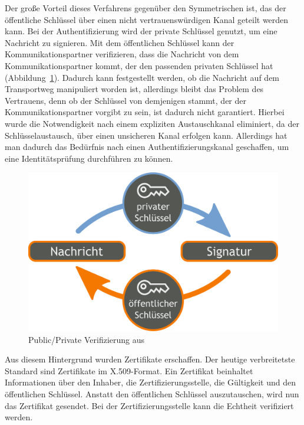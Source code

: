 \documentclass[11pt,a4paper]{report}
\begin{document}
Der große Vorteil dieses Verfahrens gegenüber den Symmetrischen ist, das der öffentliche Schlüssel über einen nicht vertrauenswürdigen Kanal geteilt werden kann. Bei der Authentifizierung wird der private Schlüssel genutzt, um eine Nachricht zu signieren. Mit dem öffentlichen Schlüssel kann der Kommunikationspartner verifizieren, dass die Nachricht von dem Kommunikationspartner kommt, der den passenden privaten Schlüssel hat (Abbildung~\ref{fig:pp_veri}). Dadurch kann festgestellt werden, ob die Nachricht auf dem Transportweg manipuliert worden ist, allerdings bleibt das Problem des Vertrauens, denn ob der Schlüssel von demjenigen stammt, der der Kommunikationspartner vorgibt zu sein, ist dadurch nicht garantiert. Hierbei wurde die Notwendigkeit nach einem expliziten Austauschkanal eliminiert, da der Schlüsselaustausch, über einen unsicheren Kanal erfolgen kann. Allerdings hat man dadurch das Bedürfnis nach einen Authentifizierungskanal geschaffen, um eine Identitätsprüfung durchführen zu können.
 
\begin{figure}[htbp]
\centering
\includegraphics[scale=0.2]{images/public_private_verification.pdf}
\caption{Public/Private Verifizierung aus \cite{wiki_asym_crypto}}
\label{fig:pp_veri}
\end{figure}

Aus diesem Hintergrund wurden Zertifikate erschaffen. Der heutige verbreitetste Standard sind Zertifikate im X.509-Format. Ein Zertifikat beinhaltet Informationen über den Inhaber, die Zertifizierungsstelle, die Gültigkeit und den öffentlichen Schlüssel. Anstatt den öffentlichen Schlüssel auszutauschen, wird nun das Zertifikat gesendet. Bei der Zertifizierungsstelle kann die Echtheit verifiziert werden. 
\end{document}
